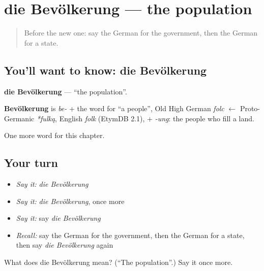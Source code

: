 \section[die Bevölkerung]{die Bevölkerung — the population}

\label{lesson:GE-C208-bevoelkerung}



\begin{quote}
Before the new one: say the German for the government, then the German for a state.
\end{quote}

\subsection*{You'll want to know: die Bevölkerung}
\textbf{die Bevölkerung} — \textquotedblleft{}the population\textquotedblright{}.

\begin{cousinweb}
\textbf{Bevölkerung} is \emph{be-} + the word for \textquotedblleft{}a people\textquotedblright{}, Old High German \emph{folc} $\leftarrow$ Proto-Germanic \emph{*fulką}, English \emph{folk} (EtymDB 2.1), + \emph{-ung}: the people who fill a land.
\end{cousinweb}

\begin{grammarlens}[title={What you've built}]
One more word for this chapter.
\end{grammarlens}

\subsection*{Your turn}
\begin{itemize}
\raggedright
  \item \emph{Say it:} \emph{die Bevölkerung}
  \item \emph{Say it:} \emph{die Bevölkerung}, once more
  \item \emph{Say it:} say \emph{die Bevölkerung}
  \item \emph{Recall:} say the German for the government, then the German for a state, then say \emph{die Bevölkerung} again
\end{itemize}

\begin{tcolorbox}[breakable,colback=teal!4,colframe=teal!35!black,title={Before you move on}]
What does die Bevölkerung mean? (\textquotedblleft{}The population\textquotedblright{}.) Say it once more.
\end{tcolorbox}
